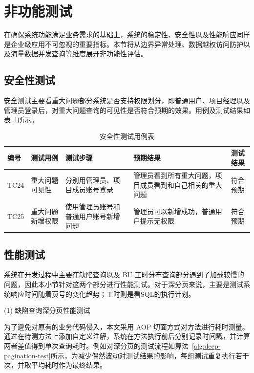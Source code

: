 \section{非功能测试}
在确保系统功能满足业务需求的基础上，系统的稳定性、安全性以及性能响应同样是企业级应用不可忽视的重要指标。本节将从边界异常处理、数据越权访问防护以及海量数据并发查询等维度展开非功能性评估。

\subsection{安全性测试}
安全测试主要看重大问题部分系统是否支持权限划分，即普通用户、项目经理以及管理员登录后，对重大问题查询的可见性是否符合预期的效果。用例及测试结果如表~\ref{tab:serious_problem_safety_testcase}所示。
\begin{table}[H]
	\centering
	\caption{安全性测试用例表}
	\label{tab:serious_problem_safety_testcase}
	{\songti\seuwuhao\selectfont
		\begin{tabular}{p{0.8cm} p{2.4cm} p{3.2cm} p{3.6cm} p{2.2cm}}
			\toprule
			编号 & 测试用例 & 测试步骤 & 预期结果 & 测试结果 \\
			\midrule
			TC24 & 重大问题可见性 & 分别用管理员、项目成员账号登录 & 管理员看到所有重大问题，项目成员看到和自己相关的重大问题 & 符合预期 \\
			TC25 & 重大问题新增权限 & 使用管理员账号和普通用户账号新增问题 & 管理员可以新增成功，普通用户提示无权限 & 符合预期 \\
			\bottomrule
		\end{tabular}
	}
\end{table}

\subsection{性能测试}
系统在开发过程中主要在缺陷查询以及 BU 工时分布查询部分遇到了加载较慢的问题，因此本小节针对这两个部分进行性能测试。对于深分页来说，主要是测试系统响应时间随着页号的变化趋势；工时则是看SQL的执行计划。

(1) 缺陷查询深分页性能测试

为了避免对原有的业务代码侵入，本文采用 AOP 切面方式对方法进行耗时测量。通过在待测方法上添加自定义注解，系统在方法执行前后分别记录时间戳，并计算两者差值得到单次查询耗时。例如对深分页的测试流程如算法~\ref{alg:deep-pagination-test}所示，为减少偶然波动对测试结果的影响，每组测试重复执行若干次，并取平均耗时作为最终结果。

\begin{algorithm}[htbp]
	\songti\seuwuhao\selectfont
	\caption{深分页查询性能对比测试流程}
	\label{alg:deep-pagination-test}
	
\end{algorithm}


